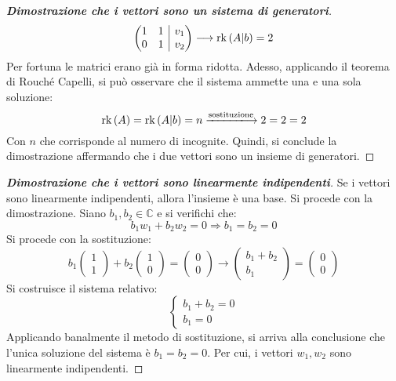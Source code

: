 \documentclass[a4paper]{article}
\makeatletter
\DeclareMathOperator{\rk}{rk}
\newenvironment{rowequmat}[1]{\left(\array{@{}#1@{}}}{\endarray\right)}
\makeatother
\begin{document}
\begin{proof}[\textbf{Dimostrazione che i vettori sono un sistema di generatori}]
\begin{equation*}
\begin{array}{rll}
\begin{rowequmat}{cc|c}
					1 & 1 & v_{1} \\ 0 & 1 & v_{2}
				\end{rowequmat} \longrightarrow \rk\left(A|b\right) = 2
			\end{array}
		\end{equation*}
		Per fortuna le matrici erano già in forma ridotta. Adesso, applicando il teorema di Rouché Capelli, si può osservare che il sistema ammette una e una sola soluzione:
		\begin{equation*}
			\rk\left(A\right) = \rk\left(A|b\right) = n \xlongrightarrow{\text{sostituzione}} 2 = 2 = 2
		\end{equation*}
		Con $n$ che corrisponde al numero di incognite. Quindi, si conclude la dimostrazione affermando che i due vettori sono un insieme di generatori.
	\end{proof}\newpage
	
	\begin{proof}[\textbf{Dimostrazione che i vettori sono linearmente indipendenti}]
		Se i vettori sono linearmente indipendenti, allora l'insieme è una base. Si procede con la dimostrazione. Siano $b_{1}, b_{2} \in \mathbb{C}$ e si verifichi che:
		\begin{equation*}
			b_{1} w_{1} + b_{2} w_{2} = 0 \Rightarrow b_{1} = b_{2} = 0
		\end{equation*}
		Si procede con la sostituzione:
		\begin{equation*}
			b_{1} \begin{pmatrix}
				1 \\ 1
			\end{pmatrix} +
			b_{2} \begin{pmatrix}
				1 \\ 0
			\end{pmatrix} =
			\begin{pmatrix}
				0 \\ 0
			\end{pmatrix} \longrightarrow
			\begin{pmatrix}
				b_{1} + b_{2} \\
				b_{1}
			\end{pmatrix} = \begin{pmatrix}
				0 \\ 0
			\end{pmatrix}
		\end{equation*}
		Si costruisce il sistema relativo:
		\begin{equation*}
			\begin{cases}
				b_{1} + b_{2} = 0 \\
				b_{1} = 0
			\end{cases}
		\end{equation*}
		Applicando banalmente il metodo di sostituzione, si arriva alla conclusione che l'unica soluzione del sistema è $b_{1} = b_{2} = 0$. Per cui, i vettori $w_{1}, w_{2}$ sono linearmente indipendenti.
	\end{proof}\:\newline
	
\end{document}

